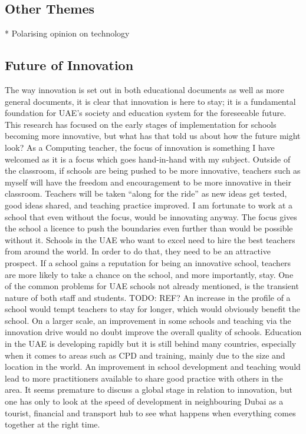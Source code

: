 \subsection{Other Themes}
* Polarising opinion on technology

\subsection{Future of Innovation}

The way innovation is set out in both educational documents as well as more general documents, it is clear that innovation is here to stay; it is a fundamental foundation for UAE’s society and education system for the foreseeable future.
This research has focused on the early stages of implementation for schools becoming more innovative, but what has that told us about how the future might look?
As a Computing teacher, the focus of innovation is something I have welcomed as it is a focus which goes hand-in-hand with my subject. Outside of the classroom, if schools are being pushed to be more innovative, teachers such as myself will have the freedom and encouragement to be more innovative in their classroom. Teachers will be taken “along for the ride” as new ideas get tested, good ideas shared, and teaching practice improved.
I am fortunate to work at a school that even without the focus, would be innovating anyway. The focus gives the school a licence to push the boundaries even further than would be possible without it.
Schools in the UAE who want to excel need to hire the best teachers from around the world. In order to do that, they need to be an attractive prospect. If a school gains a reputation for being an innovative school, teachers are more likely to take a chance on the school, and more importantly, stay. 
One of the common problems for UAE schools not already mentioned, is the transient nature of both staff and students. TODO: REF? An increase in the profile of a school would tempt teachers to stay for longer, which would obviously benefit the school.
On a larger scale, an improvement in some schools and teaching via the innovation drive would no doubt improve the overall quality of schools. Education in the UAE is developing rapidly but it is still behind many countries, especially when it comes to areas such as CPD and training, mainly due to the size and location in the world. An improvement in school development and teaching would lead to more practitioners available to share good practice with others in the area.
It seems premature to discuss a global stage in relation to innovation, but one has only to look at the speed of development in neighbouring Dubai as a tourist, financial and transport hub to see what happens when everything comes together at the right time.
